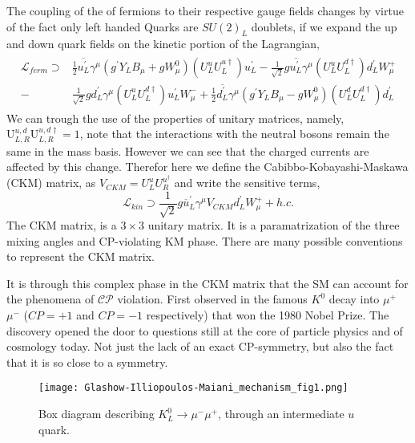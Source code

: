 %
The coupling of the of fermions to their respective gauge fields changes by virtue of the fact only left handed Quarks are $SU(2)_L$ doublets, if we expand the up and down quark fields on the kinetic portion of the Lagrangian,
%
\begin{align}
\begin{split}
\mathcal{L}_{ferm} \supset & 
\frac{1}{2} \overline{u^\prime_L} \gamma^\mu \left( g^\prime Y_L B_\mu + g W^0_\mu  \right) \left(U^u_L U^{u \dagger}_L \right) u^\prime_L - \frac{1}{\sqrt{2}} g \overline{u^\prime_L} \gamma^\mu \left( U^u_L U^{d \dagger}_L \right) d^\prime_L W^+_\mu \\ \nonumber   
- 
& \frac{1}{\sqrt{2}} g d^\prime_L \gamma^\mu \left( U^u_L U^{d \dagger}_L \right) u^\prime_L W^-_\mu 
+ 
\frac{1}{2} \overline{d^\prime_L} \gamma^\mu \left( g^\prime Y_L B_\mu - g W^0_\mu \right) \left( U^d_L U^{d \dagger}_L \right) d^\prime_L  
\end{split}
\end{align}
%
We can trough the use of the properties of unitary matrices, namely, $ \mathrm{U}^{u,d}_{L,R} \mathrm{U}^{u,d \dagger}_{L,R} = 1$, note that the interactions with the neutral bosons remain the same in the mass basis. However we can see that the charged currents are affected by this change.
%
Therefor here we define the Cabibbo-Kobayashi-Maskawa (CKM) matrix, as $V_{CKM} = U^u_L U^{u ^\dagger }_R $ and write the sensitive terms,
%
\begin{equation}
\mathcal{L}_{kin} \supset \frac{1}{\sqrt{2}} g \overline{u}^\prime_L \gamma^\mu V_{CKM} d_L^\prime W^+_\mu + h.c. 
\end{equation}
%
The CKM matrix, is a $3 \times 3$ unitary matrix. It is a paramatrization of the three mixing angles and CP-violating KM phase. There are many possible conventions to represent the CKM matrix. 

It is through this complex phase in the CKM matrix that the SM can account for the phenomena of $\mathcal{CP}$ violation. First observed in the famous $K^0$ decay into $\mu^+$ $\mu^-$ ($CP=+1$ and $CP=-1$ respectively) that won the 1980 Nobel Prize. The discovery opened the door to questions still at the core of particle physics and of cosmology today. Not just the lack of an exact CP-symmetry, but also the fact that it is so close to a symmetry. 

\begin{figure}[H]
	\centering
	\texttt{[image: Glashow-Illiopoulos-Maiani\_mechanism\_fig1.png]}
	\caption{Box diagram describing $K_L^0\rightarrow\mu^-\mu^+$, through an intermediate $u$ quark.}
	\label{fig:Kaon}
\end{figure}

